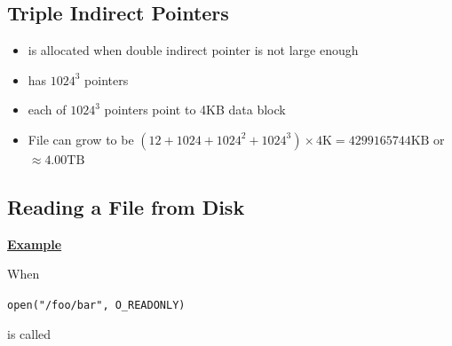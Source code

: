 \documentclass[12pt]{article}
\begin{document}
\subsection{Triple Indirect Pointers}

\begin{itemize}
    \item is allocated when double indirect pointer is not large enough
    \item has $1024^3$ pointers
    \item each of $1024^3$ pointers point to 4KB data block
    \item File can grow to be $(12 + 1024 + 1024^2 + 1024^3) \times 4\text{K} = 4299165744\text{KB}$ or $\approx 4.00 \text{TB}$
\end{itemize}

\subsection{Reading a File from Disk}

\underline{\textbf{Example}}

\bigskip

When

\bigskip

\texttt{open("/foo/bar", O\_READONLY)}

\bigskip

is called

\bigskip
\end{document}
